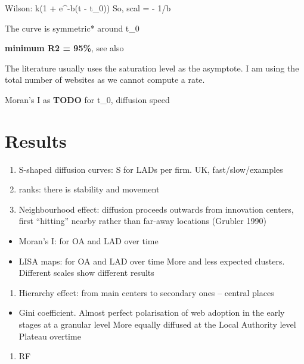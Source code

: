 \documentclass[
  authoryear,
  preprint,
  3p]{elsarticle}
\providecommand{\tightlist}{%
  \setlength{\itemsep}{0pt}\setlength{\parskip}{0pt}}\usepackage{longtable,booktabs,array}
\begin{document}
Wilson: k(1 + e\^{}-b(t - t\_0)) So, scal = - 1/b

The curve is symmetric* around t\_0

\textbf{minimum R2 = 95\%}, see also \citet{grubler1990rise}

The literature usually uses the saturation level as the asymptote. I am
using the total number of websites as we cannot compute a rate.

Moran's I as \citet{ding2010modeling} \textbf{TODO} for t\_0, diffusion
speed

\section{Results}\label{sec4}

\begin{enumerate}
\def\labelenumi{\arabic{enumi}.}
\item
  S-shaped diffusion curves: S for LADs per firm. UK, fast/slow/examples
\item
  ranks: there is stability and movement
\item
  Neighbourhood effect: diffusion proceeds outwards from innovation
  centers, first ``hitting'' nearby rather than far-away locations
  (Grubler 1990)
\end{enumerate}

\begin{itemize}
\item
  Moran's I: for OA and LAD over time
\item
  LISA maps: for OA and LAD over time More and less expected clusters.
  Different scales show different results
\end{itemize}

\begin{enumerate}
\def\labelenumi{\arabic{enumi}.}
\setcounter{enumi}{3}
\tightlist
\item
  Hierarchy effect: from main centers to secondary ones -- central
  places
\end{enumerate}

\begin{itemize}
\tightlist
\item
  Gini coefficient. Almost perfect polarisation of web adoption in the
  early stages at a granular level More equally diffused at the Local
  Authority level Plateau overtime
\end{itemize}

\begin{enumerate}
\def\labelenumi{\arabic{enumi}.}
\setcounter{enumi}{4}
\tightlist
\item
  RF
\end{enumerate}
\end{document}
